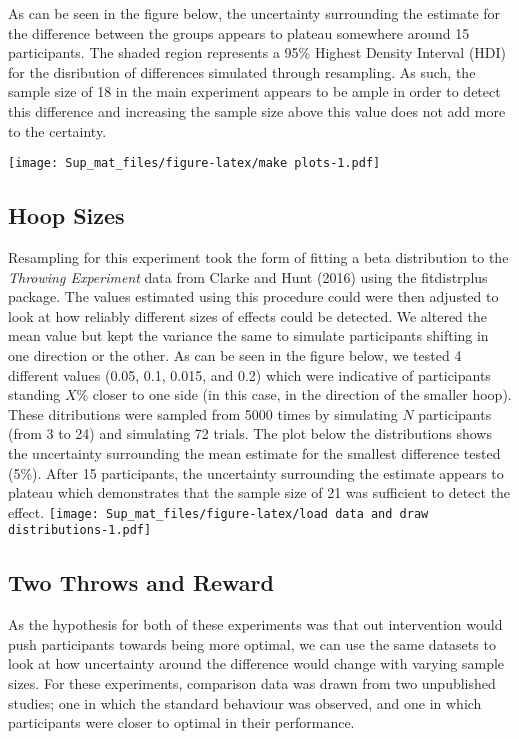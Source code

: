 \documentclass[
]{article}
\begin{document}
As can be seen in the figure below, the uncertainty surrounding the estimate for the difference between the groups appears to plateau somewhere around 15 participants. The shaded region represents a 95\% Highest Density Interval (HDI) for the disribution of differences simulated through resampling. As such, the sample size of 18 in the main experiment appears to be ample in order to detect this difference and increasing the sample size above this value does not add more to the certainty.

\texttt{[image: Sup\_mat\_files/figure-latex/make plots-1.pdf]}

\hypertarget{hoop-sizes}{%
\subsection{Hoop Sizes}\label{hoop-sizes}}

Resampling for this experiment took the form of fitting a beta distribution to the \emph{Throwing Experiment} data from Clarke and Hunt (2016) using the fitdistrplus package. The values estimated using this procedure could were then adjusted to look at how reliably different sizes of effects could be detected. We altered the mean value but kept the variance the same to simulate participants shifting in one direction or the other. As can be seen in the figure below, we tested 4 different values (0.05, 0.1, 0.015, and 0.2) which were indicative of participants standing \(X\)\% closer to one side (in this case, in the direction of the smaller hoop). These ditributions were sampled from 5000 times by simulating \(N\) participants (from 3 to 24) and simulating 72 trials. The plot below the distributions shows the uncertainty surrounding the mean estimate for the smallest difference tested (5\%). After 15 participants, the uncertainty surrounding the estimate appears to plateau which demonstrates that the sample size of 21 was sufficient to detect the effect.
\texttt{[image: Sup\_mat\_files/figure-latex/load data and draw distributions-1.pdf]}

\hypertarget{two-throws-and-reward}{%
\subsection{Two Throws and Reward}\label{two-throws-and-reward}}

As the hypothesis for both of these experiments was that out intervention would push participants towards being more optimal, we can use the same datasets to look at how uncertainty around the difference would change with varying sample sizes. For these experiments, comparison data was drawn from two unpublished studies; one in which the standard behaviour was observed, and one in which participants were closer to optimal in their performance.
\end{document}
